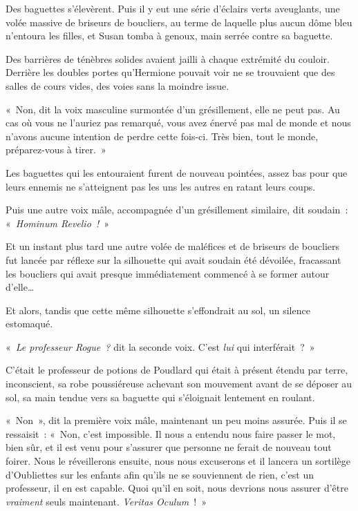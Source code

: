 Des baguettes s'élevèrent.
Puis il y eut une série d'éclairs verts aveuglants, une volée massive de briseurs de boucliers, au terme de laquelle plus aucun dôme bleu n'entoura les filles, et Susan tomba à genoux, main serrée contre sa baguette.

Des barrières de ténèbres solides avaient jailli à chaque extrémité du couloir.
Derrière les doubles portes qu'Hermione pouvait voir ne se trouvaient que des salles de cours vides, des voies sans la moindre issue.

«~Non, dit la voix masculine surmontée d'un grésillement, elle ne peut pas.
Au cas où vous ne l'auriez pas remarqué, vous avez énervé pas mal de monde et nous n'avons aucune intention de perdre cette fois-ci.
Très bien, tout le monde, préparez-vous à tirer.~»

Les baguettes qui les entouraient furent de nouveau pointées, assez bas pour que leurs ennemis ne s'atteignent pas les uns les autres en ratant leurs coups.

Puis une autre voix mâle, accompagnée d'un grésillement similaire, dit soudain~: «~\emph{Hominum Revelio~!}~»

Et un instant plus tard une autre volée de maléfices et de briseurs de boucliers fut lancée par réflexe sur la silhouette qui avait soudain été dévoilée, fracassant les boucliers qui avait presque immédiatement commencé à se former autour d'elle…

Et alors, tandis que cette même silhouette s'effondrait au sol, un silence estomaqué.

«~\emph{Le professeur Rogue~?} dit la seconde voix.
C'est \emph{lui} qui interférait~?~»

C'était le professeur de potions de Poudlard qui était à présent étendu par terre, inconscient, sa robe poussiéreuse achevant son mouvement avant de se déposer au sol, sa main tendue vers sa baguette qui s'éloignait lentement en roulant.

«~Non~», dit la première voix mâle, maintenant un peu moins assurée.
Puis il se ressaisit~: «~Non, c'est impossible.
Il nous a entendu nous faire passer le mot, bien sûr, et il est venu pour s'assurer que personne ne ferait de nouveau tout foirer.
Nous le réveillerons ensuite, nous nous excuserons et il lancera un sortilège d'Oubliettes sur les enfants afin qu'ils ne se souviennent de rien, c'est un professeur, il en est capable.
Quoi qu'il en soit, nous devrions nous assurer d'être \emph{vraiment} seuls maintenant.
\emph{Veritas Oculum}~!~»

